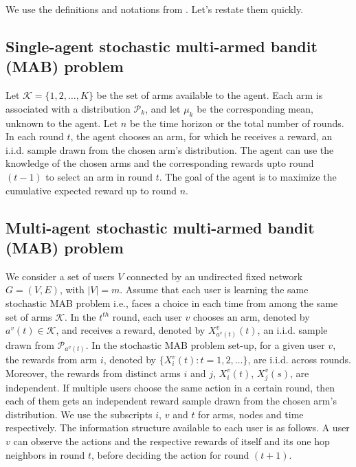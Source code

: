 \documentclass{article}
\begin{document}
We use the definitions and notations from \cite{DBLP:journals/corr/KollaJG16}. Let's restate them quickly.

\subsection{Single-agent stochastic multi-armed bandit (MAB) problem}
Let $\mathcal{K} = \lbrace 1, 2,\dots, K \rbrace$ be the set of arms available to the agent. Each arm is associated with a distribution $\mathcal{P}_k$, and let $\mu_k$ be the corresponding mean, unknown to the agent. Let $n$ be the time horizon or the total number of rounds. In each round $t$, the agent chooses an arm, for which he receives a reward, an i.i.d. sample drawn from the chosen arm's distribution. The agent can use the knowledge of the chosen arms and the corresponding rewards upto round $(t-1)$ to select an arm in round $t.$ The goal of the agent is to maximize the cumulative expected reward up to round $n$.

\subsection{Multi-agent stochastic multi-armed bandit (MAB) problem}
We consider a set of users $V$ connected by an undirected fixed network $G=(V,E)$, with $| V | = m$. Assume that each user is learning the same stochastic MAB problem i.e., faces a choice in each time from among the same set of arms $\mathcal{K}$. In the $t^{th}$ round, each user $v$ chooses an arm, denoted by $a^v(t) \in \mathcal{K}$, and receives a reward, denoted by $X^v_{a^v(t)}(t)$, an i.i.d. sample drawn from $\mathcal{P}_{a^v(t)}$.
In the  stochastic MAB problem set-up, for a given user $v$, the rewards from arm $i$, denoted by $\{X^v_i(t): t = 1, 2, \ldots \}$, are i.i.d. across rounds. Moreover, the rewards from distinct arms $i$ and $j$, $X^v_i(t)$, $X^v_j(s)$, are independent. If multiple users choose the same action in a certain round, then each of them gets an independent reward sample drawn from the chosen arm's distribution. We use the subscripts $i$, $v$ and $t$ for arms, nodes and time respectively. The information structure available to each user is as follows. A user $v$ can observe the actions and the respective rewards of itself and its one hop neighbors in round $t$, before deciding the action for round $(t+1)$.
\end{document}
